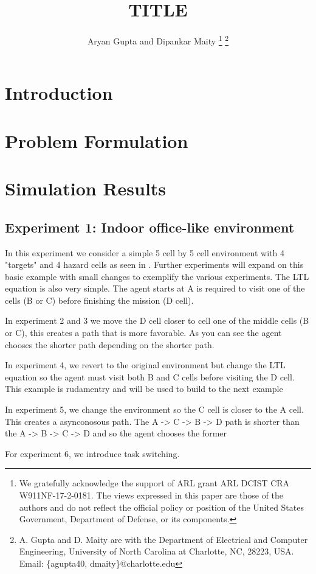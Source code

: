 \documentclass[letter paper, 10 pt, conference]{ieeeconf}
\title{\LARGE\bf TITLE }
\author{Aryan Gupta and Dipankar Maity
\thanks{
We gratefully acknowledge the support of ARL grant ARL DCIST CRA W911NF-17-2-0181. The views expressed in this paper are those of the authors and do not reflect the official policy or position of the United States Government, Department of Defense, or its components.
}
\thanks{A. Gupta and D. Maity are with the Department of Electrical and Computer Engineering, University of North Carolina at Charlotte,  NC, 28223, USA.
Email: 		{\{agupta40, dmaity\}@charlotte.edu}
}
}
\begin{document}
\maketitle


\begin{abstract}

\end{abstract}

\section{Introduction}

\section{Problem Formulation}


\section{Simulation Results}

\subsection{Experiment 1: Indoor office-like environment}
In this experiment we consider a simple 5 cell by 5 cell environment with 4 "targets" and 4 hazard cells as seen in \fig{}. Further experiments will expand on this basic example with small changes to exemplify the various experiments. The LTL equation is also very simple. The agent starts at A is required to visit one of the cells (B or C) before finishing the mission (D cell).

In experiment 2 and 3 we move the D cell closer to cell one of the middle cells (B or C), this creates a path that is more favorable. As you can see the agent chooses the shorter path depending on the shorter path.


In experiment 4, we revert to the original environment but change the LTL equation so the agent must visit both B and C cells before visiting the D cell. This example is rudamentry and will be used to build to the next example

In experiment 5, we change the environment so the C cell is closer to the A cell. This creates a asynconosous path. The A -> C -> B -> D path is shorter than the A -> B -> C -> D and so the agent chooses the former

For experiment 6, we introduce task switching.
\end{document}

